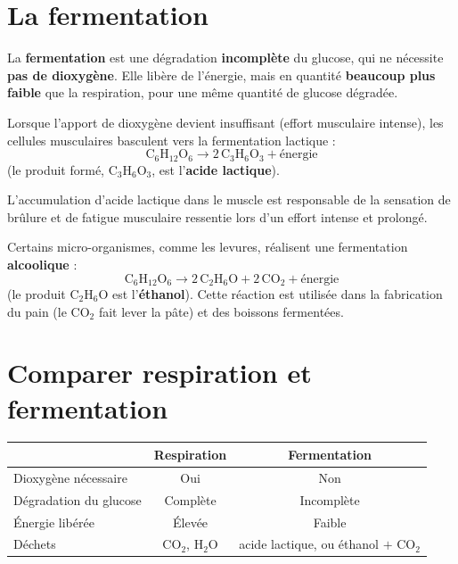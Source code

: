 \section{La fermentation}

\begin{definition}[Fermentation]
La \textbf{fermentation} est une dégradation \textbf{incomplète} du glucose, qui ne
nécessite \textbf{pas de dioxygène}. Elle libère de l'énergie, mais en quantité
\textbf{beaucoup plus faible} que la respiration, pour une même quantité de glucose
dégradée.
\end{definition}

\begin{propriete}
Lorsque l'apport de dioxygène devient insuffisant (effort musculaire intense), les
cellules musculaires basculent vers la fermentation lactique :
\[
\mathrm{C_6H_{12}O_6 \longrightarrow 2\,C_3H_6O_3 + \text{énergie}}
\]
(le produit formé, $\mathrm{C_3H_6O_3}$, est l'\textbf{acide lactique}).
\end{propriete}

\begin{remarque}
L'accumulation d'acide lactique dans le muscle est responsable de la sensation de
brûlure et de fatigue musculaire ressentie lors d'un effort intense et prolongé.
\end{remarque}

\begin{propriete}
Certains micro-organismes, comme les levures, réalisent une fermentation
\textbf{alcoolique} :
\[
\mathrm{C_6H_{12}O_6 \longrightarrow 2\,C_2H_6O + 2\,CO_2 + \text{énergie}}
\]
(le produit $\mathrm{C_2H_6O}$ est l'\textbf{éthanol}). Cette réaction est utilisée dans
la fabrication du pain (le $\mathrm{CO_2}$ fait lever la pâte) et des boissons
fermentées.
\end{propriete}

\section{Comparer respiration et fermentation}

\begin{propriete}
\begin{center}
\small
\begin{tabular}{lcc}
\toprule
& \textbf{Respiration} & \textbf{Fermentation} \\
\midrule
Dioxygène nécessaire & Oui & Non \\
Dégradation du glucose & Complète & Incomplète \\
Énergie libérée & Élevée & Faible \\
Déchets & $\mathrm{CO_2}$, $\mathrm{H_2O}$ & acide lactique, ou éthanol $+$ $\mathrm{CO_2}$ \\
\bottomrule
\end{tabular}
\end{center}
\end{propriete}

